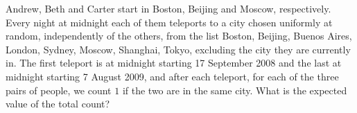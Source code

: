 Andrew, Beth and Carter start in Boston, Beijing and Moscow, respectively. Every night at midnight each of them teleports to a city chosen uniformly at random, independently of the others, from the list Boston, Beijing, Buenos Aires, London, Sydney, Moscow, Shanghai, Tokyo, excluding the city they are currently in. The first teleport is at midnight starting 17 September 2008 and the last at midnight starting 7 August 2009, and after each teleport, for each of the three pairs of people, we count $1$ if the two are in the same city. What is the expected value of the total count?
